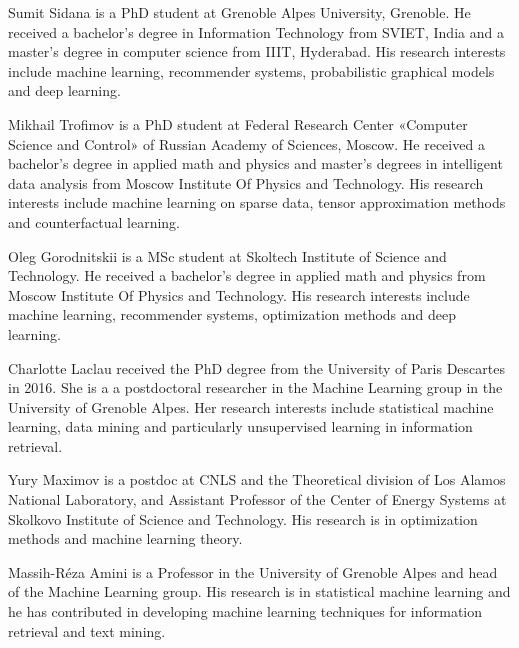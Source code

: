 \documentclass[10pt,journal,compsoc]{IEEEtran}
\begin{document}
\begin{sloppypar}
\begin{IEEEbiographynophoto}{Sumit Sidana}
is a PhD student at Grenoble Alpes University, Grenoble. He received a bachelor’s degree in Information Technology from SVIET, India and a master’s degree in computer science from IIIT, Hyderabad. His research interests include machine learning, recommender systems, probabilistic graphical models and deep learning.
\end{IEEEbiographynophoto}
\begin{IEEEbiographynophoto}{Mikhail Trofimov}
is a PhD student at Federal Research Center «Computer Science and Control» of Russian Academy of Sciences, Moscow. He received a bachelor's degree in applied math and physics and master's degrees in intelligent data analysis from Moscow Institute Of Physics and Technology. His research interests include machine learning on sparse data, tensor approximation methods and counterfactual learning.
\end{IEEEbiographynophoto}
\begin{IEEEbiographynophoto}{Oleg Gorodnitskii}
is a MSc student at Skoltech Institute of Science and Technology. He received a bachelor's degree in applied math and physics from Moscow Institute Of Physics and Technology. His research interests include machine learning, recommender systems, optimization methods and deep learning.
\end{IEEEbiographynophoto}
\begin{IEEEbiographynophoto}{Charlotte Laclau} received the PhD degree from the University of Paris Descartes in 2016. She is a a postdoctoral researcher in the Machine Learning group in the University of Grenoble Alpes. Her research interests include statistical machine learning, data mining and particularly unsupervised learning in information retrieval.
\end{IEEEbiographynophoto}
\begin{IEEEbiographynophoto}{Yury Maximov}
is a postdoc at CNLS and the Theoretical division of Los Alamos National Laboratory, and Assistant Professor of the Center of Energy Systems at Skolkovo Institute of Science and Technology. His research is in optimization methods and machine learning theory.
\end{IEEEbiographynophoto}
\begin{IEEEbiographynophoto} {Massih-R\'eza Amini}
 is a Professor in the University of Grenoble Alpes and head of the Machine Learning group. His  research is in statistical machine learning and he has contributed in developing machine learning techniques for information retrieval and text mining.
\end{IEEEbiographynophoto}


\end{sloppypar}
\end{document}
